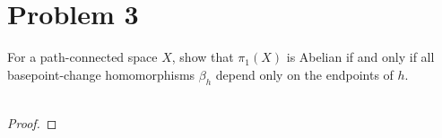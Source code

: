 \documentclass[fontsize=11pt]{scrartcl} %
\numberwithin{equation}{section} %
\numberwithin{figure}{section} %
\numberwithin{table}{section} %
\begin{document}
\section*{Problem 3}
For a path-connected space $X$, show that $\pi_1(X)$ is Abelian if and only if
all basepoint-change homomorphisms $\beta_h$ depend only on the endpoints of
$h$.
\\
\\
\begin{proof}
    
\end{proof}
\end{document}
